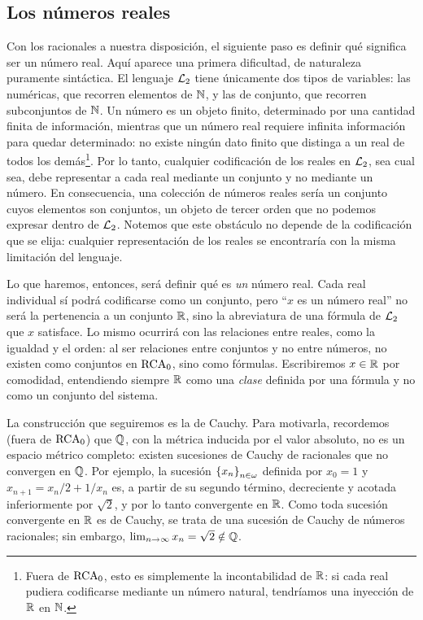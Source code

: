 \subsection{Los números reales}

Con los racionales a nuestra disposición, el siguiente paso es definir qué significa ser un número real. Aquí aparece una primera dificultad, de naturaleza puramente sintáctica. El lenguaje $\ARITMETICA$ tiene únicamente dos tipos de variables: las numéricas, que recorren elementos de $\NN$, y las de conjunto, que recorren subconjuntos de $\NN$. Un número es un objeto finito, determinado por una cantidad finita de información, mientras que un número real requiere infinita información para quedar determinado: no existe ningún dato finito que distinga a un real de todos los demás\footnote{Fuera de $\RCA$, esto es simplemente la incontabilidad de $\RR$: si cada real pudiera codificarse mediante un número natural, tendríamos una inyección de $\RR$ en $\NN$.}. Por lo tanto, cualquier codificación de los reales en $\ARITMETICA$, sea cual sea, debe representar a cada real mediante un conjunto y no mediante un número. En consecuencia, una colección de números reales sería un conjunto cuyos elementos son conjuntos, un objeto de tercer orden que no podemos expresar dentro de $\ARITMETICA$. Notemos que este obstáculo no depende de la codificación que se elija: cualquier representación de los reales se encontraría con la misma limitación del lenguaje.

Lo que haremos, entonces, será definir qué es \emph{un} número real. Cada real individual sí podrá codificarse como un conjunto, pero ``$x$ es un número real'' no será la pertenencia a un conjunto $\RR$, sino la abreviatura de una fórmula de $\ARITMETICA$ que $x$ satisface. Lo mismo ocurrirá con las relaciones entre reales, como la igualdad y el orden: al ser relaciones entre conjuntos y no entre números, no existen como conjuntos en $\RCA$, sino como fórmulas. Escribiremos $x\in\RR$ por comodidad, entendiendo siempre $\RR$ como una \emph{clase} definida por una fórmula y no como un conjunto del sistema.

La construcción que seguiremos es la de Cauchy. Para motivarla, recordemos (fuera de $\RCA$) que $\QQ$, con la métrica inducida por el valor absoluto, no es un espacio métrico completo: existen sucesiones de Cauchy de racionales que no convergen en $\QQ$. Por ejemplo, la sucesión $\set*{x_{n}}_{n\in\omega}$ definida por $x_{0} = 1$ y $x_{n + 1} = x_{n} / 2 + 1 / x_{n}$ es, a partir de su segundo término, decreciente y acotada inferiormente por $\sqrt{2}$, y por lo tanto convergente en $\RR$. Como toda sucesión convergente en $\RR$ es de Cauchy, se trata de una sucesión de Cauchy de números racionales; sin embargo, $\lim_{n\to\infty}x_{n} =\sqrt{2}\notin\QQ$.

